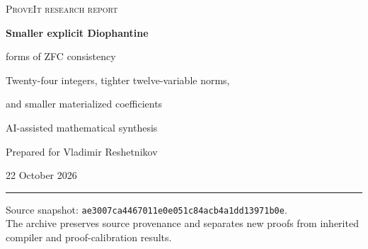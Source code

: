 \documentclass[11pt,letterpaper]{article}
\theoremstyle{remark}
\begin{document}
\hypersetup{pageanchor=false}
\begin{titlepage}
\vspace*{0.55in}
{\color{inkblue}\Large\textsc{ProveIt research report}\par}
\vspace{0.35in}
{\huge\bfseries Smaller explicit Diophantine\par
 forms of ZFC consistency\par}
\vspace{0.3in}
{\Large Twenty-four integers, tighter twelve-variable norms,\par
 and smaller materialized coefficients\par}
\vspace{0.35in}
{\large AI-assisted mathematical synthesis\par}
{\large Prepared for Vladimir Reshetnikov\par}
\vspace{0.15in}
{22 October 2026\par}
\vspace{0.4in}
\noindent\rule{\textwidth}{0.6pt}
\begin{abstract}
\noindent
Combining rational Pell saturation, separating-root norms, signed-domain
arguments and a concrete padding controller gives an explicit polynomial
in 24 unrestricted integers of degree 1936 with a 167-operation circuit.
ZFC proves that its lack of integer solutions is equivalent to
$\operatorname{Con}(\mathrm{ZFC})$.  Its three-equation version has degree
1920 and uses 162 operations.  Three twelve-positive-variable alternatives
have degree/operation pairs $(1069,123)$, $(1073,121)$ and $(1081,120)$.
An exact refactoring reduces the existing degree-1353 twelve-variable
equation to 113 operations.  Retaining the 943-tile language while
replacing five-power rounding reduces the fixed base to
$B=2^{6364399}$; all four resulting integers are materialized.
The report supplies explicit polynomial definitions, ordinary
mathematical proofs, arithmetic circuits and reproducible finite audits.
It does not claim a global minimum or a new kernel-checked end-to-end
formalization.
\end{abstract}
\vfill
\noindent\small
Source snapshot: \texttt{ae3007ca4467011e0e051c84acb4a1dd13971b0e}.\\
The archive preserves source provenance and separates new proofs from
inherited compiler and proof-calibration results.
\end{titlepage}

\hypersetup{pageanchor=true}
\tableofcontents
\clearpage
{}







\end{document}
